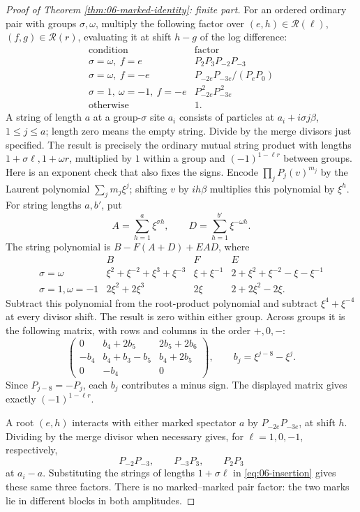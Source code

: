 \begin{proof}[Proof of Theorem \ref{thm:06-marked-identity}: finite part]
For an ordered ordinary pair with groups \(\sigma,\omega\), multiply
the following factor over
\((e,h)\in\mathcal R(\ell)\), \((f,g)\in\mathcal R(r)\), evaluating it
at shift \(h-g\) of the log difference:
\[
\begin{array}{c|l}
 \text{condition}&\text{factor}\\ \hline
 \sigma=\omega,\ f=e & P_2P_3P_{-2}P_{-3}\\
 \sigma=\omega,\ f=-e & P_{-2e}P_{-3e}/(P_eP_0)\\
 \sigma=1,\ \omega=-1,\ f=-e & P_{-2e}^{\,2}P_{-3e}^{\,2}\\
 \text{otherwise}&1 .
\end{array}
\]
A string of length $a$ at a group-$\sigma$ site $a_i$ consists of
particles at $a_i+i\sigma j\beta$, $1\le j\le a$; length zero
means the empty string. Divide by the merge divisors just specified.
The result is precisely
the ordinary mutual string product with lengths
\(1+\sigma\ell,1+\omega r\), multiplied by \(1\) within a group and
\((-1)^{1-\ell r}\) between groups.
Here is an exponent check that also fixes the signs.
Encode \(\prod_j P_j(v)^{m_j}\) by the Laurent polynomial
\(\sum_j m_j\xi^j\); shifting \(v\) by \(ih\beta\) multiplies
this polynomial by \(\xi^h\).
For string lengths \(a,b'\), put
\[
 A=\sum_{h=1}^{a}\xi^{\sigma h},\qquad
 D=\sum_{h=1}^{b'}\xi^{-\omega h}.
\]
The string polynomial is \(B-F(A+D)+EAD\), where
\[
\begin{array}{c|ccc}
 &B&F&E\\ \hline
 \sigma=\omega&
 \xi^2+\xi^{-2}+\xi^3+\xi^{-3}&\xi+\xi^{-1}&
 2+\xi^2+\xi^{-2}-\xi-\xi^{-1}\\
 \sigma=1,\omega=-1&
 2\xi^2+2\xi^3&2\xi&2+2\xi^2-2\xi .
\end{array}
\]
Subtract this polynomial from the root-product polynomial and
subtract \(\xi^4+\xi^{-4}\) at every divisor shift.
The result is zero within either group.  Across groups it is the
following matrix, with rows and columns in the order \(+,0,-\):
\[
 \begin{pmatrix}
 0&b_4+2b_5&2b_5+2b_6\\
 -b_4&b_4+b_3-b_5&b_4+2b_5\\
 0&-b_4&0
 \end{pmatrix},
 \qquad b_j=\xi^{j-8}-\xi^j.
\]
Since \(P_{j-8}=-P_j\), each \(b_j\) contributes a minus sign.
The displayed matrix gives exactly \((-1)^{1-\ell r}\).

A root \((e,h)\) interacts with either marked spectator \(a\)
by \(P_{-2e}P_{-3e}\), at shift \(h\).  Dividing by the merge divisor
when necessary gives, for \(\ell=1,0,-1\), respectively,
\[
 P_{-2}P_{-3},\qquad P_{-3}P_3,\qquad P_2P_3
\]
at \(a_i-a\).  Substituting the strings of lengths \(1+\sigma\ell\)
in \eqref{eq:06-insertion} gives these same three factors.
There is no marked--marked pair factor: the two marks lie in
different blocks in both amplitudes.


\end{proof}
